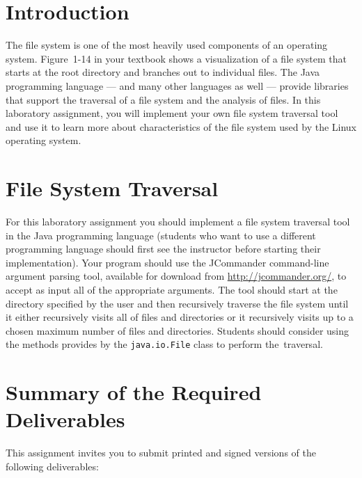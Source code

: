 

\usepackage[compact]{titlesec}



\section*{Introduction}
  
The file system is one of the most heavily used components of an operating system.  Figure~1-14 in your textbook shows a
visualization of a file system that starts at the root directory and branches out to individual files.  The Java programming
language --- and many other languages as well --- provide libraries that support the traversal of a file system and the analysis
of files. In this laboratory assignment, you will implement your own file system traversal tool and use it to learn more about
characteristics of the file system used by the Linux operating system.

\section*{File System Traversal}

For this laboratory assignment you should implement a file system traversal tool in the Java programming language (students who
want to use a different programming language should first see the instructor before starting their implementation). Your program
should use the JCommander command-line argument parsing tool, available for download from \url{http://jcommander.org/}, to accept
as input all of the appropriate arguments. The tool should start at the directory specified by the user and then recursively
traverse the file system until it either recursively visits all of files and directories or it recursively visits up to a
chosen maximum number of files and directories. Students should consider using the methods provides by the {\tt java.io.File}
class to perform \mbox{the traversal}.



\section*{Summary of the Required Deliverables}

  This assignment invites you to submit printed and signed versions of the following deliverables: 

